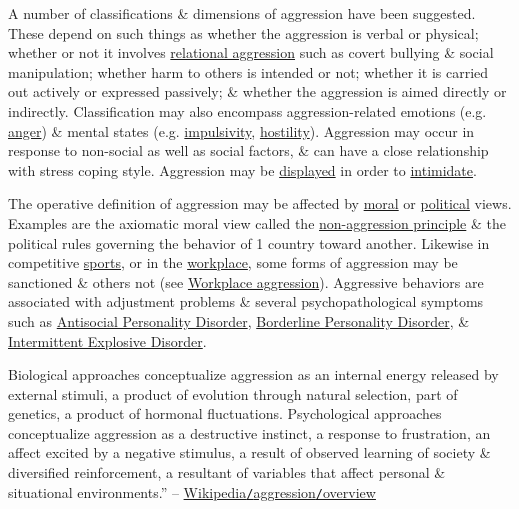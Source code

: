 \documentclass[oneside]{book}
\numberwithin{equation}{section}
\begin{document}
A number of classifications \& dimensions of aggression have been suggested. These depend on such things as whether the aggression is verbal or physical; whether or not it involves \href{https://en.wikipedia.org/wiki/Relational_aggression}{relational aggression} such as covert bullying \& social manipulation; whether harm to others is intended or not; whether it is carried out actively or expressed passively; \& whether the aggression is aimed directly or indirectly. Classification may also encompass aggression-related emotions (e.g. \href{https://en.wikipedia.org/wiki/Anger}{anger}) \& mental states (e.g. \href{https://en.wikipedia.org/wiki/Impulsivity}{impulsivity}, \href{https://en.wikipedia.org/wiki/Hostility}{hostility}). Aggression may occur in response to non-social as well as social factors, \& can have a close relationship with stress coping style. Aggression may be \href{https://en.wikipedia.org/wiki/Threat_display}{displayed} in order to \href{https://en.wikipedia.org/wiki/Intimidate}{intimidate}.

The operative definition of aggression may be affected by \href{https://en.wikipedia.org/wiki/Morality}{moral} or \href{https://en.wikipedia.org/wiki/Politics}{political} views. Examples are the axiomatic moral view called the \href{https://en.wikipedia.org/wiki/Non-aggression_principle}{non-aggression principle} \& the political rules governing the behavior of 1 country toward another. Likewise in competitive \href{https://en.wikipedia.org/wiki/Sports}{sports}, or in the \href{https://en.wikipedia.org/wiki/Workplace}{workplace}, some forms of aggression may be sanctioned \& others not (see \href{https://en.wikipedia.org/wiki/Workplace_aggression}{Workplace aggression}). Aggressive behaviors are associated with adjustment problems \& several psychopathological symptoms such as \href{https://en.wikipedia.org/wiki/Antisocial_Personality_Disorder}{Antisocial Personality Disorder}, \href{https://en.wikipedia.org/wiki/Borderline_Personality_Disorder}{Borderline Personality Disorder}, \& \href{https://en.wikipedia.org/wiki/Intermittent_Explosive_Disorder}{Intermittent Explosive Disorder}.

Biological approaches conceptualize aggression as an internal energy released by external stimuli, a product of evolution through natural selection, part of genetics, a product of hormonal fluctuations. Psychological approaches conceptualize aggression as a destructive instinct, a response to frustration, an affect excited by a negative stimulus, a result of observed learning of society \& diversified reinforcement, a resultant of variables that affect personal \& situational environments.'' -- \href{https://en.wikipedia.org/wiki/Aggression#Overview}{Wikipedia\texttt{/}aggression\texttt{/}overview}
\end{document}
